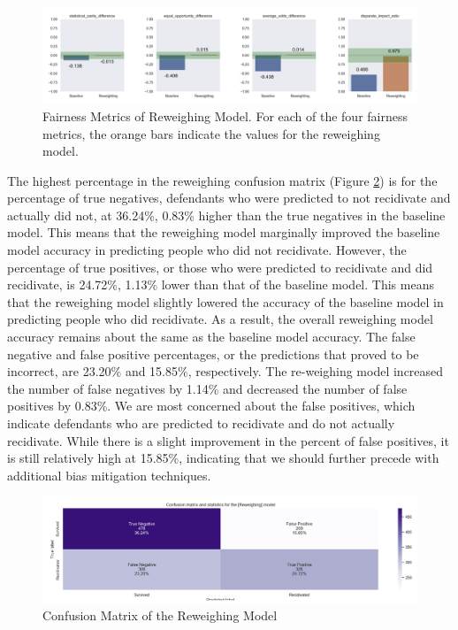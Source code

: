 \documentclass[water,article,submit,moreauthors,pdftex]{mdpi}
\begin{document}
\begin{figure}

{\centering \includegraphics[width=1\linewidth]{../images/reweighting_metrics} 

}

\caption{Fairness Metrics of Reweighing Model. For each of the four fairness metrics, the orange bars indicate the values for the reweighing model.}\label{fig:reweighing metrics}
\end{figure}

The highest percentage in the reweighing confusion matrix (Figure
\ref{fig:reweighing matrix}) is for the percentage of true negatives,
defendants who were predicted to not recidivate and actually did not, at
36.24\%, 0.83\% higher than the true negatives in the baseline model.
This means that the reweighing model marginally improved the baseline
model accuracy in predicting people who did not recidivate. However, the
percentage of true positives, or those who were predicted to recidivate
and did recidivate, is 24.72\%, 1.13\% lower than that of the baseline
model. This means that the reweighing model slightly lowered the
accuracy of the baseline model in predicting people who did recidivate.
As a result, the overall reweighing model accuracy remains about the
same as the baseline model accuracy. The false negative and false
positive percentages, or the predictions that proved to be incorrect,
are 23.20\% and 15.85\%, respectively. The re-weighing model increased
the number of false negatives by 1.14\% and decreased the number of
false positives by 0.83\%. We are most concerned about the false
positives, which indicate defendants who are predicted to recidivate and
do not actually recidivate. While there is a slight improvement in the
percent of false positives, it is still relatively high at 15.85\%,
indicating that we should further precede with additional bias
mitigation techniques.

\begin{figure}

{\centering \includegraphics[width=1\linewidth]{../images/reweighing_matrix} 

}

\caption{Confusion Matrix of the Reweighing Model}\label{fig:reweighing matrix}
\end{figure}
\end{document}
